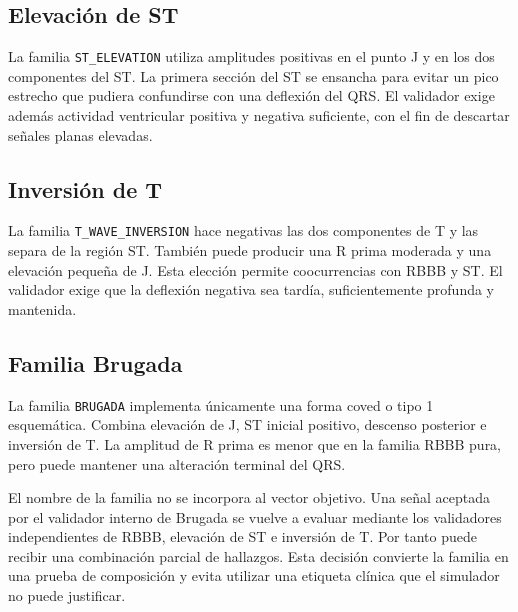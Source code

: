 \subsection{Elevación de ST}

La familia \texttt{ST\_ELEVATION} utiliza amplitudes positivas en el punto J y en los dos componentes del ST. La primera sección del ST se ensancha para evitar un pico estrecho que pudiera confundirse con una deflexión del QRS. El validador exige además actividad ventricular positiva y negativa suficiente, con el fin de descartar señales planas elevadas.

\subsection{Inversión de T}

La familia \texttt{T\_WAVE\_INVERSION} hace negativas las dos componentes de T y las separa de la región ST. También puede producir una R prima moderada y una elevación pequeña de J. Esta elección permite coocurrencias con RBBB y ST. El validador exige que la deflexión negativa sea tardía, suficientemente profunda y mantenida.

\subsection{Familia Brugada}

La familia \texttt{BRUGADA} implementa únicamente una forma coved o tipo 1 esquemática. Combina elevación de J, ST inicial positivo, descenso posterior e inversión de T. La amplitud de R prima es menor que en la familia RBBB pura, pero puede mantener una alteración terminal del QRS.

El nombre de la familia no se incorpora al vector objetivo. Una señal aceptada por el validador interno de Brugada se vuelve a evaluar mediante los validadores independientes de RBBB, elevación de ST e inversión de T. Por tanto puede recibir una combinación parcial de hallazgos. Esta decisión convierte la familia en una prueba de composición y evita utilizar una etiqueta clínica que el simulador no puede justificar.

